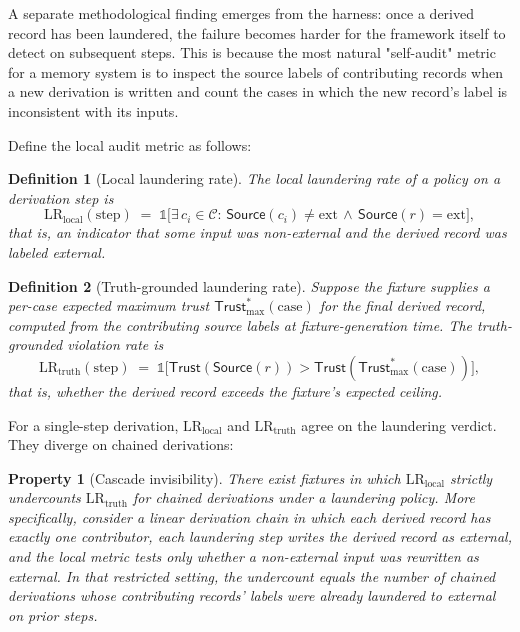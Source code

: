 \documentclass[11pt]{article}
\newtheorem{definition}{Definition}
\newtheorem{property}{Property}
\newcommand{\Source}{\mathsf{Source}}
\newcommand{\Trust}{\mathsf{Trust}}
\newcommand{\ext}{\ensuremath{\mathrm{ext}}}
\begin{document}
A separate methodological finding emerges from the harness: once a derived record has been laundered, the failure becomes harder for the framework itself to detect on subsequent steps. This is because the most natural "self-audit" metric for a memory system is to inspect the source labels of contributing records when a new derivation is written and count the cases in which the new record's label is inconsistent with its inputs.

Define the local audit metric as follows:

\begin{definition}[Local laundering rate]
\label{def:local-rate}
The local laundering rate of a policy on a derivation step is
\[
\mathrm{LR}_{\text{local}}(\text{step}) \;=\; \mathbb{1}\bigl[\exists\, c_i \in \mathcal{C}:\, \Source(c_i) \neq \ext\,\wedge\,\Source(r) = \ext\bigr],
\]
that is, an indicator that some input was non-\emph{external} and the derived record was labeled \emph{external}.
\end{definition}

\begin{definition}[Truth-grounded laundering rate]
\label{def:truth-rate}
Suppose the fixture supplies a per-case \emph{expected maximum trust} $\Trust_{\max}^*(\text{case})$ for the final derived record, computed from the contributing source labels at fixture-generation time. The truth-grounded violation rate is
\[
\mathrm{LR}_{\text{truth}}(\text{step}) \;=\; \mathbb{1}\bigl[\Trust(\Source(r)) > \Trust(\Trust_{\max}^*(\text{case}))\bigr],
\]
that is, whether the derived record exceeds the fixture's expected ceiling.
\end{definition}

For a single-step derivation, $\mathrm{LR}_{\text{local}}$ and $\mathrm{LR}_{\text{truth}}$ agree on the laundering verdict. They diverge on chained derivations:

\begin{property}[Cascade invisibility]
\label{prop:cascade}
There exist fixtures in which $\mathrm{LR}_{\text{local}}$ strictly undercounts $\mathrm{LR}_{\text{truth}}$ for chained derivations under a laundering policy. More specifically, consider a linear derivation chain in which each derived record has exactly one contributor, each laundering step writes the derived record as \emph{external}, and the local metric tests only whether a non-\emph{external} input was rewritten as \emph{external}. In that restricted setting, the undercount equals the number of chained derivations whose contributing records' labels were already laundered to \emph{external} on prior steps.
\end{property}
\end{document}
